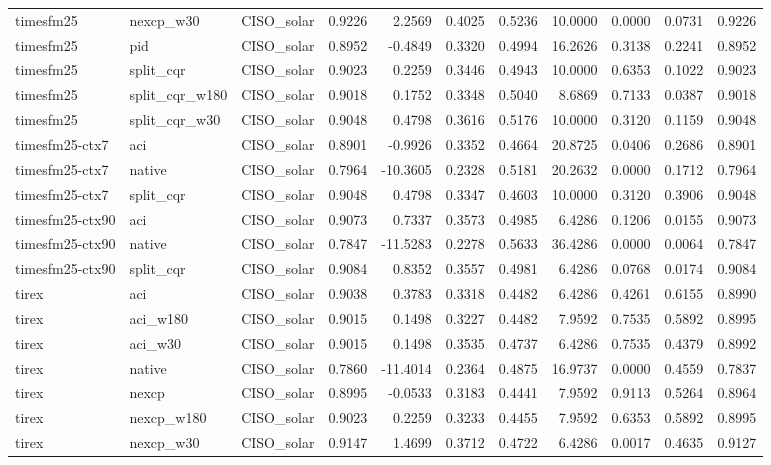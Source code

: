 \begin{tabular}{lllrrrrrrrr}
timesfm25 & nexcp_w30 & CISO_solar & 0.9226 & 2.2569 & 0.4025 & 0.5236 & 10.0000 & 0.0000 & 0.0731 & 0.9226 \\
timesfm25 & pid & CISO_solar & 0.8952 & -0.4849 & 0.3320 & 0.4994 & 16.2626 & 0.3138 & 0.2241 & 0.8952 \\
timesfm25 & split_cqr & CISO_solar & 0.9023 & 0.2259 & 0.3446 & 0.4943 & 10.0000 & 0.6353 & 0.1022 & 0.9023 \\
timesfm25 & split_cqr_w180 & CISO_solar & 0.9018 & 0.1752 & 0.3348 & 0.5040 & 8.6869 & 0.7133 & 0.0387 & 0.9018 \\
timesfm25 & split_cqr_w30 & CISO_solar & 0.9048 & 0.4798 & 0.3616 & 0.5176 & 10.0000 & 0.3120 & 0.1159 & 0.9048 \\
timesfm25-ctx7 & aci & CISO_solar & 0.8901 & -0.9926 & 0.3352 & 0.4664 & 20.8725 & 0.0406 & 0.2686 & 0.8901 \\
timesfm25-ctx7 & native & CISO_solar & 0.7964 & -10.3605 & 0.2328 & 0.5181 & 20.2632 & 0.0000 & 0.1712 & 0.7964 \\
timesfm25-ctx7 & split_cqr & CISO_solar & 0.9048 & 0.4798 & 0.3347 & 0.4603 & 10.0000 & 0.3120 & 0.3906 & 0.9048 \\
timesfm25-ctx90 & aci & CISO_solar & 0.9073 & 0.7337 & 0.3573 & 0.4985 & 6.4286 & 0.1206 & 0.0155 & 0.9073 \\
timesfm25-ctx90 & native & CISO_solar & 0.7847 & -11.5283 & 0.2278 & 0.5633 & 36.4286 & 0.0000 & 0.0064 & 0.7847 \\
timesfm25-ctx90 & split_cqr & CISO_solar & 0.9084 & 0.8352 & 0.3557 & 0.4981 & 6.4286 & 0.0768 & 0.0174 & 0.9084 \\
tirex & aci & CISO_solar & 0.9038 & 0.3783 & 0.3318 & 0.4482 & 6.4286 & 0.4261 & 0.6155 & 0.8990 \\
tirex & aci_w180 & CISO_solar & 0.9015 & 0.1498 & 0.3227 & 0.4482 & 7.9592 & 0.7535 & 0.5892 & 0.8995 \\
tirex & aci_w30 & CISO_solar & 0.9015 & 0.1498 & 0.3535 & 0.4737 & 6.4286 & 0.7535 & 0.4379 & 0.8992 \\
tirex & native & CISO_solar & 0.7860 & -11.4014 & 0.2364 & 0.4875 & 16.9737 & 0.0000 & 0.4559 & 0.7837 \\
tirex & nexcp & CISO_solar & 0.8995 & -0.0533 & 0.3183 & 0.4441 & 7.9592 & 0.9113 & 0.5264 & 0.8964 \\
tirex & nexcp_w180 & CISO_solar & 0.9023 & 0.2259 & 0.3233 & 0.4455 & 7.9592 & 0.6353 & 0.5892 & 0.8995 \\
tirex & nexcp_w30 & CISO_solar & 0.9147 & 1.4699 & 0.3712 & 0.4722 & 6.4286 & 0.0017 & 0.4635 & 0.9127 \\

\end{tabular}
